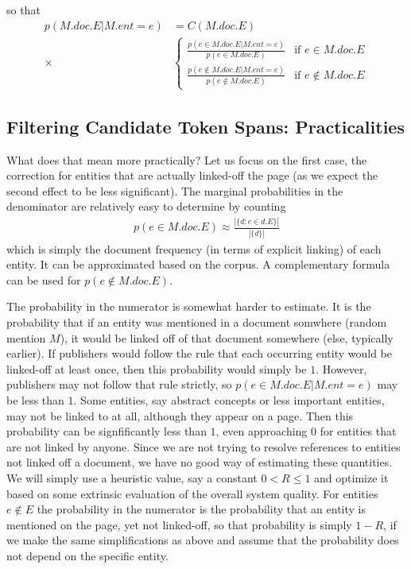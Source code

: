 \documentclass{article}
\begin{document}
so that 
\begin{align}
p(M.doc.E | M.ent=e) & = C(M.doc.E) \\
\times & \begin{cases}
\frac{p(e \in M.doc.E | M.ent=e)}{p(e \in M.doc.E)} & \text{if $e \in M.doc.E$} \\
\frac{p(e \not\in M.doc.E | M.ent=e)}{p(e \not\in M.doc.E)} & \text{if $e \not\in M.doc.E$} 
\end{cases} \nonumber
\end{align}

\subsection*{Filtering Candidate Token Spans: Practicalities} 

What does that mean more practically? Let us focus on the first case, the correction for entities that are actually linked-off the page (as we expect the second effect to be less significant). The marginal probabilities in the denominator are relatively easy to determine by counting
\begin{align}
p(e \in M.doc.E) \approx \frac{|\{d: e \in d.E\}|}{|\{d\}|}
\end{align}
which is simply the document frequency (in terms of explicit linking) of each entity. It can be approximated based on the corpus. A complementary formula can be used for $p(e \not\in M.doc.E)$. 

The probability in the numerator is somewhat harder to estimate. It is the probability that if an entity was mentioned in a document somwhere (random mention $M$), it would be linked off of that document somewhere (else, typically earlier). If publishers would follow the rule that each occurring entity would be linked-off at least once, then this probability would simply be $1$. However, publishers may not follow that rule strictly, so $p(e \in M.doc.E | M.ent=e)$ may be less than $1$. Some entities, say abstract concepts or less important entities, may not be linked to at all, although they appear on a page. Then this probability can be signfificantly less than $1$, even approaching $0$ for entities that are not linked by anyone. Since we are not trying to resolve references to entities not linked off a document, we have no good way of estimating these quantities. We will simply use a heuristic value, say a constant $0 < R \leq 1$ and optimize it based on some extrinsic evaluation of the overall system quality. For entities $e \not\in E$ the probability in the numerator is the probability that an entity is mentioned on the page, yet not linked-off, so that probability is simply $1-R$, if we make the same simplifications as above and assume that the probability does not depend on the specific entity.   
 
\end{document}
